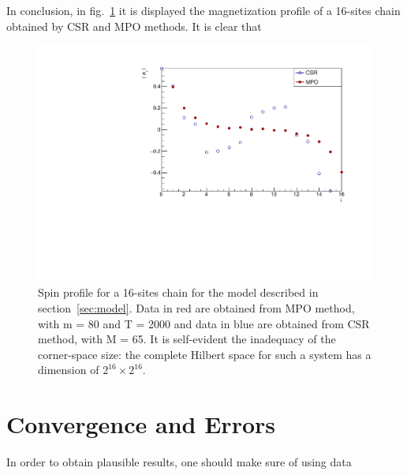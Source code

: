 In conclusion, in fig.~\ref{fig:LMComparison16s1051} it is displayed the magnetization profile of a 16-sites chain obtained by CSR and MPO methods. It is clear that 

\begin{figure}[H]
    \centering
    \includegraphics[scale=0.7]{Figures/16sites/LMComparison16s1051.pdf}
    \caption{Spin profile for a 16-sites chain for the model described in section~\ref{sec:model}. Data in red are obtained from MPO method, with m = 80 and T = 2000 and data in blue are obtained from CSR method, with M = 65. It is self-evident the inadequacy of the corner-space size: the complete Hilbert space for such a system has a dimension of $2^{16} \times 2^{16}$.}
    \label{fig:LMComparison16s1051}
\end{figure}



\section{Convergence and Errors}
In order to obtain plausible results, one should make sure of using data 


